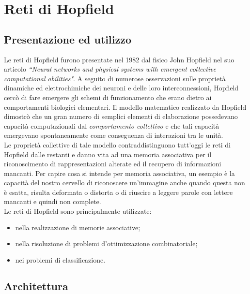 \documentclass[12pt,a4paper,oneside]{book}
\begin{document}




	
\chapter{Reti di Hopfield}

	\section{Presentazione ed utilizzo}

	Le reti di Hopfield furono presentate nel 1982 dal fisico John Hopfield nel suo articolo \textit{``Neural networks and physical systems with emergent collective computational abilities"}. A seguito di numerose osservazioni sulle proprietà dinamiche ed elettrochimiche dei neuroni e delle loro interconnessioni, Hopfield cercò di fare emergere gli schemi di funzionamento che erano dietro ai comportamenti biologici elementari. Il modello matematico realizzato da Hopfield dimostrò che un gran numero di semplici elementi di elaborazione possedevano capacità computazionali dal \emph{comportamento collettivo} e che tali capacità emergevano spontaneamente come conseguenza di interazioni tra le unità.\\
	Le proprietà collettive di tale modello contraddistinguono tutt'oggi le reti di Hopfield dalle restanti e danno vita ad una memoria associativa per il riconoscimento di rappresentazioni alterate ed il recupero di informazioni mancanti. Per capire cosa si intende per memoria associativa, un esempio è la capacità del nostro cervello di riconoscere un'immagine anche quando questa non è esatta, risulta deformata o distorta o di riuscire a leggere parole con lettere mancanti e quindi non complete.\\
	Le reti di Hopfield sono principalmente utilizzate:

	\begin{itemize}
		\item nella realizzazione di memorie associative;
		\item nella risoluzione di problemi d'ottimizzazione combinatoriale;
		\item nei problemi di classificazione.
	\end{itemize}

	\section{Architettura}
\end{document}

